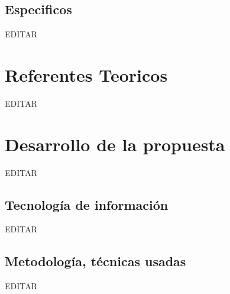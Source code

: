 \documentclass[preprint,12pt]{elsarticle}
\begin{document}
\subsection{\textbf{Especificos}}

EDITAR\\

 


\section{Referentes Teoricos}

EDITAR\\




\section{Desarrollo de la propuesta}

EDITAR\\


\subsection{\textbf{Tecnología de información}}

EDITAR\\


\subsection{\textbf{Metodología, técnicas usadas}}

EDITAR\\

\end{document}
